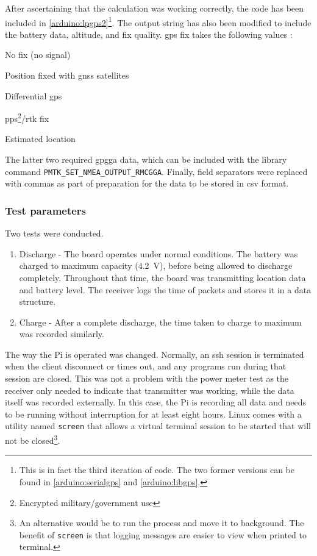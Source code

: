 After ascertaining that the calculation was working correctly, the code has been included in
\cref{arduino:lpgps2}\footnote{
    This is in fact the third iteration of code. The two former versions can be found in \cref{arduino:serialgps} and \cref{arduino:libgps}.
}. The output string has also been modified to include the battery data,
altitude, and fix quality.
\acrshort{gps} fix takes the following values \cite{arcgis:gpsfix}:

\begin{description}[align=left, labelwidth=1cm,labelindent=0.5cm]
    \item[0] No fix (no signal)
    \item[1] Position fixed with \acrshort{gnss} satellites
    \item[2] Differential \acrshort{gps}
    \item[3-5] \acrshort{pps}\footnote{Encrypted military/government use}/\acrshort{rtk} fix
    \item[6] Estimated location
        \label{table:fix}
\end{description}

The latter two
required \gls{gpgga} data, which can be included with the library command
\lstinline{PMTK_SET_NMEA_OUTPUT_RMCGGA}. Finally, field separators were replaced with commas
as part of preparation for the data to be stored in \acrshort{csv} format.

\subsubsection{Test parameters}
Two tests were conducted.
\begin{enumerate}
    \item Discharge - The board operates under normal conditions. The battery was
          charged to maximum capacity (\qty{4.2}{\V}), before being allowed to discharge
          completely. Throughout that time, the board was transmitting
          location data and battery level. The receiver logs the time of
          packets and stores it in a data structure.
    \item Charge - After a complete discharge, the time taken to charge to maximum
          was recorded similarly.
\end{enumerate}

The way the Pi is operated was changed. Normally, an \acrshort{ssh} session
is terminated when the client disconnect or times out, and any programs run during that
session are closed. This was not a problem with the
power meter test as the receiver only needed to indicate that transmitter was working,
while the data itself was recorded externally. In this case, the Pi is recording all data
and needs to be running without interruption for at least eight hours.
Linux comes with a utility named
\lstinline{screen} that allows a virtual terminal session to be started that will
not be closed\footnote{An alternative
    would be to run the process and move it to background. The benefit of \lstinline{screen} is that
    logging messages are easier to view when printed to terminal.}.


